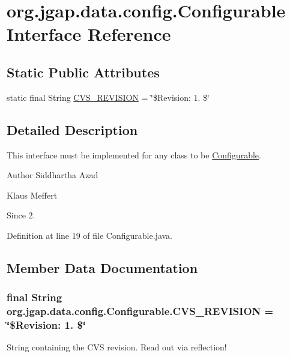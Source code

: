 \hypertarget{interfaceorg_1_1jgap_1_1data_1_1config_1_1_configurable}{\section{org.\-jgap.\-data.\-config.\-Configurable Interface Reference}
\label{interfaceorg_1_1jgap_1_1data_1_1config_1_1_configurable}
}
\subsection*{Static Public Attributes}
\begin{DoxyCompactItemize}
\item 
static final String \hyperlink{interfaceorg_1_1jgap_1_1data_1_1config_1_1_configurable_ad6924e53287871ad0ccea13df7a6676e}{C\-V\-S\-\_\-\-R\-E\-V\-I\-S\-I\-O\-N} = \char`\"{}\$Revision\-: 1. \$\char`\"{}
\end{DoxyCompactItemize}


\subsection{Detailed Description}
This interface must be implemented for any class to be \hyperlink{interfaceorg_1_1jgap_1_1data_1_1config_1_1_configurable}{Configurable}.

\begin{DoxyAuthor}{Author}
Siddhartha Azad 

Klaus Meffert 
\end{DoxyAuthor}
\begin{DoxySince}{Since}
2. 
\end{DoxySince}


Definition at line 19 of file Configurable.\-java.



\subsection{Member Data Documentation}
\hypertarget{interfaceorg_1_1jgap_1_1data_1_1config_1_1_configurable_ad6924e53287871ad0ccea13df7a6676e}{
\subsubsection[{C\-V\-S\-\_\-\-R\-E\-V\-I\-S\-I\-O\-N}]{\setlength{\rightskip}{0pt plus 5cm}final String org.\-jgap.\-data.\-config.\-Configurable.\-C\-V\-S\-\_\-\-R\-E\-V\-I\-S\-I\-O\-N = \char`\"{}\$Revision\-: 1. \$\char`\"{}\hspace{0.3cm}{\ttfamily [static]}}}\label{interfaceorg_1_1jgap_1_1data_1_1config_1_1_configurable_ad6924e53287871ad0ccea13df7a6676e}
String containing the C\-V\-S revision. Read out via reflection! 

